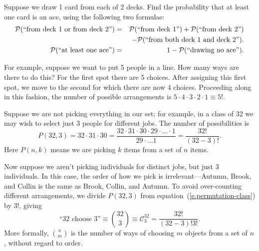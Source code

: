 \begin{exercisebox}
Suppose we draw 1 card from each of 2 decks.  Find the probability that at least one card is an ace, using the following two formulae:
\begin{eqnarray*}
\mathcal{P}(\textrm{``from deck 1 or from deck 2''}) &=& \mathcal{P}(\textrm{``from deck 1''})+	\mathcal{P}(\textrm{``from deck 2''}) \\
&& - \mathcal{P}(\textrm{``from both deck 1 and deck 2''}).\\
\mathcal{P}(\textrm{``at least one ace''}) &=& 1-\mathcal{P}(\textrm{``drawing no ace''}).
\end{eqnarray*}
\end{exercisebox}
 
 For example, suppose we want to put 5 people in a line. How many ways are there to do this?  For the first spot there are 5 choices.  After assigning this first spot, we move to the second for which there are now 4 choices. Proceeding along in this fashion, the number of possible arrangements is $5\cdot4\cdot3\cdot2\cdot1 \equiv 5!$.

Suppose we are not picking everything in our set; for example, in a class of 32 we may wish to select just 3 people for different jobs. The number of possibilities is
\begin{equation}\label{e.permutation-class}
 P(32,3) = 32\cdot31\cdot30 = \frac{32\cdot31\cdot30\cdot29\cdot\ldots\cdot 1}{29\cdot\ldots 1} = \frac{32!}{(32-3)!}.
\end{equation}
Here $P(n,k)$ means we are picking $k$ items from a set of $n$ items.

Now suppose we aren't picking individuals for distinct jobs, but just 3 individuals. In this case, the order of how we pick is irrelevant---Autumn, Brook, and Collin is the same as Brook, Collin, and Autumn.  To avoid over-counting different arrangements, we divide $P(32,3)$ from equation~(\ref{e.permutation-class}) by $3!$, giving
\begin{equation}\label{e.combination-class}
\textrm{``32 choose 3''} \equiv {32\choose3} \equiv \mathcal{C}^{32}_{3} = \frac{32!}{(32-3)!3!}.
\end{equation}
More formally, ${n\choose m}$ is the number of ways of choosing $m$ objects from a set of $n$, without regard to order.

